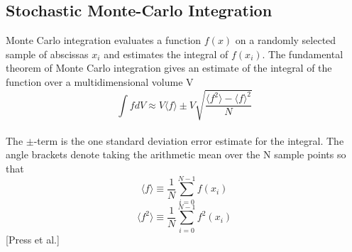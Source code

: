 \documentclass[%
reprint,nofootinbib,
amsmath,amssymb,
aps,
]{revtex4-1}
\begin{document}
\subsection*{Stochastic Monte-Carlo Integration}\noindent 
Monte Carlo integration evaluates a function $f(x)$ on a randomly selected sample of abscissas $x_i$ and estimates the integral of $f(x_i)$. The fundamental theorem of Monte Carlo integration gives an estimate of the integral of the function over a multidimensional volume V\vspace{2mm} \\
\begin{equation}
	\int f dV \approx V \langle f\rangle \pm V\sqrt{\dfrac{ \langle f^2 \rangle - \langle f \rangle^2}{N}}
\end{equation}\vspace{2mm} \\
The $\pm$-term is the one standard deviation error estimate for the integral. The angle brackets denote taking the arithmetic mean over the N sample points so that \vspace{2mm} \\
\begin{equation*}
	\langle f \rangle \equiv \dfrac{1}{N}\sum_{i=0}^{N-1}f(x_i)
\end{equation*}
\begin{equation*}
\langle f^2 \rangle \equiv \dfrac{1}{N}\sum_{i=0}^{N-1}f^2(x_i)
\end{equation*}\vspace{2mm} 
\hspace{65mm}[Press et al.]
\end{document}
